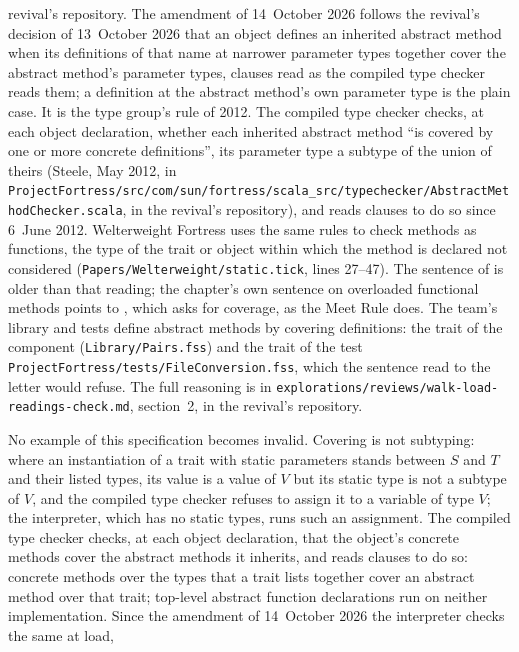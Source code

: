 \begin{description}
revival's repository.
The amendment of 14~October 2026 follows the revival's decision of 13~October
2026 that an object defines an inherited abstract method when its definitions
of that name at narrower parameter types together cover the abstract method's
parameter types,  clauses read as the compiled type checker
reads them; a definition at the abstract method's own parameter type is the
plain case.
It is the type group's rule of 2012.
The compiled type checker checks, at each object declaration, whether each
inherited abstract method ``is covered by one or more concrete definitions'',
its parameter type a subtype of the union of theirs (Steele, May 2012, in
\nolinkurl{ProjectFortress/src/com/sun/fortress/scala_src/typechecker/AbstractMethodChecker.scala},
in the revival's repository), and reads  clauses to do so since
6~June 2012.
Welterweight Fortress uses the same rules to check methods as functions, the
type of the trait or object within which the method is declared not considered
(\nolinkurl{Papers/Welterweight/static.tick}, lines 27--47).
The sentence of  is older than that reading; the chapter's own
sentence on overloaded functional methods points to
, which asks for coverage, as the Meet Rule
does.
The team's library and tests define abstract methods by covering definitions:
the trait  of the component 
(\nolinkurl{Library/Pairs.fss}) and the trait  of the test
\nolinkurl{ProjectFortress/tests/FileConversion.fss}, which the sentence read to
the letter would refuse.
The full reasoning is in
\nolinkurl{explorations/reviews/walk-load-readings-check.md}, section~2, in the
revival's repository.
\item[Effect] No example of this specification becomes invalid.
Covering is not subtyping: where an instantiation of a trait with static
parameters stands between $S$ and $T$ and their listed types, its value is a
value of $V$ but its static type is not a subtype of $V$, and the compiled type
checker refuses to assign it to a variable of type $V$; the interpreter, which
has no static types, runs such an assignment.
The compiled type checker checks, at each object declaration, that the
object's concrete methods cover the abstract methods it inherits, and reads
 clauses to do so: concrete methods over the types that a trait
lists together cover an abstract method over that trait; top-level abstract
function declarations run on neither implementation.
Since the amendment of 14~October 2026 the interpreter checks the same at load,

\end{description}
